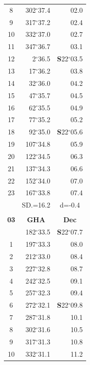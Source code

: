 \documentclass[10pt, a4paper]{report}
\begin{document}
\begin{scriptsize}
\begin{tabular*}{0.2\textwidth}[t]{@{\extracolsep{\fill}}|c|rr|}
8 & 302$^\circ$37.4 & 02.0\\
9 & 317$^\circ$37.2 & \raisebox{0.24ex}{\boldmath$\cdot$~\boldmath$\cdot$~~}02.4\\
10 & 332$^\circ$37.0 & 02.7\\
11 & 347$^\circ$36.7 & 03.1\\[2Pt]
12 & 2$^\circ$36.5 & \textbf{S}22$^\circ$03.5\\
13 & 17$^\circ$36.2 & 03.8\\
14 & 32$^\circ$36.0 & 04.2\\
15 & 47$^\circ$35.7 & \raisebox{0.24ex}{\boldmath$\cdot$~\boldmath$\cdot$~~}04.5\\
16 & 62$^\circ$35.5 & 04.9\\
17 & 77$^\circ$35.2 & 05.2\\[2Pt]
18 & 92$^\circ$35.0 & \textbf{S}22$^\circ$05.6\\
19 & 107$^\circ$34.8 & 05.9\\
20 & 122$^\circ$34.5 & 06.3\\
21 & 137$^\circ$34.3 & \raisebox{0.24ex}{\boldmath$\cdot$~\boldmath$\cdot$~~}06.6\\
22 & 152$^\circ$34.0 & 07.0\\
23 & 167$^\circ$33.8 & 07.4\\
\hline
\rule{0pt}{2.4ex} & \multicolumn{1}{c}{SD.=16.2} & \multicolumn{1}{c|}{d=-0.4}\\
\hline
\multicolumn{1}{c}{}\\[-0.5ex]\hline
\multicolumn{1}{|c|}{\rule{0pt}{2.6ex}\textbf{03}} & \multicolumn{1}{c}{\textbf{GHA}} & \multicolumn{1}{c|}{\textbf{Dec}}\\
\hline\rule{0pt}{2.6ex}\noindent
0 & 182$^\circ$33.5 & \textbf{S}22$^\circ$07.7\\
1 & 197$^\circ$33.3 & 08.0\\
2 & 212$^\circ$33.0 & 08.4\\
3 & 227$^\circ$32.8 & \raisebox{0.24ex}{\boldmath$\cdot$~\boldmath$\cdot$~~}08.7\\
4 & 242$^\circ$32.5 & 09.1\\
5 & 257$^\circ$32.3 & 09.4\\[2Pt]
6 & 272$^\circ$32.1 & \textbf{S}22$^\circ$09.8\\
7 & 287$^\circ$31.8 & 10.1\\
8 & 302$^\circ$31.6 & 10.5\\
9 & 317$^\circ$31.3 & \raisebox{0.24ex}{\boldmath$\cdot$~\boldmath$\cdot$~~}10.8\\
10 & 332$^\circ$31.1 & 11.2\\

\end{tabular*}
\end{scriptsize}
\end{document}
